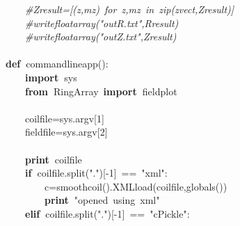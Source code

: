 \documentclass{article}
\newcommand{\hlstd}[1]{\textcolor[rgb]{0,0,0}{#1}}
\newcommand{\hlnum}[1]{\textcolor[rgb]{0.16,0.16,1}{#1}}
\newcommand{\hlstr}[1]{\textcolor[rgb]{1,0,0}{#1}}
\newcommand{\hlslc}[1]{\textcolor[rgb]{0.51,0.51,0.51}{\it{#1}}}
\newcommand{\hlsym}[1]{\textcolor[rgb]{0,0,0}{#1}}
\newcommand{\hlkwa}[1]{\textcolor[rgb]{0,0,0}{\bf{#1}}}
\newcommand{\hlkwb}[1]{\textcolor[rgb]{0.51,0,0}{#1}}
\newcommand{\hlkwd}[1]{\textcolor[rgb]{0,0,0.51}{#1}}
\begin{document}
\hlstd{}\hlstd{\ \ \ \ }\hlstd{}\hlslc{\#Zresult={[}(z,mz)\ for\ z,mz\ in\ zip(zvect,Zresult){]}}\hspace*{\fill}\\
\hlstd{}\hlstd{\ \ \ \ }\hlstd{}\hlslc{\#writefloatarray("outR.txt",Rresult)}\hspace*{\fill}\\
\hlstd{}\hlstd{\ \ \ \ }\hlstd{}\hlslc{\#writefloatarray("outZ.txt",Zresult)}\hspace*{\fill}\\
\hlstd{}\hspace*{\fill}\\
\hlkwa{def\ }\hlstd{}\hlkwd{commandlineapp}\hlstd{}\hlsym{():}\hspace*{\fill}\\
\hlstd{}\hlstd{\ \ \ \ }\hlstd{}\hlkwa{import\ }\hlstd{sys\hspace*{\fill}\\
}\hlstd{\ \ \ \ }\hlstd{}\hlkwa{from\ }\hlstd{RingArray\ }\hlkwa{import\ }\hlstd{fieldplot\hspace*{\fill}\\
\hspace*{\fill}\\
}\hlstd{\ \ \ \ }\hlstd{coilfile}\hlsym{=}\hlstd{sys}\hlsym{.}\hlstd{argv}\hlsym{{[}}\hlstd{}\hlnum{1}\hlstd{}\hlsym{{]}}\hspace*{\fill}\\
\hlstd{}\hlstd{\ \ \ \ }\hlstd{fieldfile}\hlsym{=}\hlstd{sys}\hlsym{.}\hlstd{argv}\hlsym{{[}}\hlstd{}\hlnum{2}\hlstd{}\hlsym{{]}}\hspace*{\fill}\\
\hlstd{\hspace*{\fill}\\
}\hlstd{\ \ \ \ }\hlstd{}\hlkwa{print\ }\hlstd{coilfile\hspace*{\fill}\\
}\hlstd{\ \ \ \ }\hlstd{}\hlkwa{if\ }\hlstd{coilfile}\hlsym{.}\hlstd{}\hlkwd{split}\hlstd{}\hlsym{(}\hlstd{}\hlstr{"."}\hlstd{}\hlsym{){[}{-}}\hlstd{}\hlnum{1}\hlstd{}\hlsym{{]}\ ==\ }\hlstd{}\hlstr{"xml"}\hlstd{}\hlsym{:}\hspace*{\fill}\\
\hlstd{}\hlstd{\ \ \ \ \ \ \ \ }\hlstd{c}\hlsym{=}\hlstd{}\hlkwd{smoothcoil}\hlstd{}\hlsym{().}\hlstd{}\hlkwd{XML\textunderscore load}\hlstd{}\hlsym{(}\hlstd{coilfile}\hlsym{,}\hlstd{}\hlkwb{globals}\hlstd{}\hlsym{())}\hspace*{\fill}\\
\hlstd{}\hlstd{\ \ \ \ \ \ \ \ }\hlstd{}\hlkwa{print\ }\hlstd{}\hlstr{"opened\ using\ xml"}\hlstd{\hspace*{\fill}\\
}\hlstd{\ \ \ \ }\hlstd{}\hlkwa{elif\ }\hlstd{coilfile}\hlsym{.}\hlstd{}\hlkwd{split}\hlstd{}\hlsym{(}\hlstd{}\hlstr{"."}\hlstd{}\hlsym{){[}{-}}\hlstd{}\hlnum{1}\hlstd{}\hlsym{{]}\ ==\ }\hlstd{}\hlstr{"cPickle"}\hlstd{}\hlsym{:}\hspace*{\fill}\\
\end{document}

